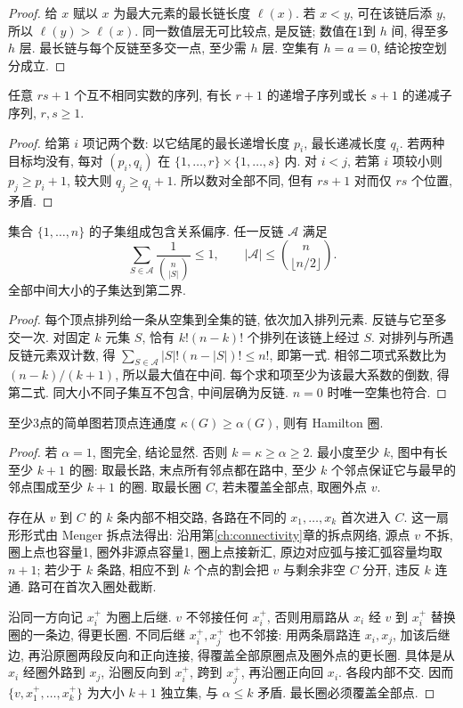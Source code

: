 \begin{proof}
给 $x$ 赋以 $x$ 为最大元素的最长链长度 $\ell(x)$. 若 $x<y$, 可在该链后添 $y$, 所以 $\ell(y)>\ell(x)$. 同一数值层无可比较点, 是反链; 数值在1到 $h$ 间, 得至多 $h$ 层. 最长链与每个反链至多交一点, 至少需 $h$ 层. 空集有 $h=a=0$, 结论按空划分成立.
\end{proof}
\begin{corollary}\label{cor:es}
任意 $rs+1$ 个互不相同实数的序列, 有长 $r+1$ 的递增子序列或长 $s+1$ 的递减子序列, $r,s\ge1$.
\end{corollary}
\begin{proof}
给第 $i$ 项记两个数: 以它结尾的最长递增长度 $p_i$, 最长递减长度 $q_i$. 若两种目标均没有, 每对 $(p_i,q_i)$ 在 $\{1,\ldots,r\}\times\{1,\ldots,s\}$ 内. 对 $i<j$, 若第 $i$ 项较小则 $p_j\ge p_i+1$, 较大则 $q_j\ge q_i+1$. 所以数对全部不同, 但有 $rs+1$ 对而仅 $rs$ 个位置, 矛盾.
\end{proof}
\begin{theorem}[Sperner]\label{thm:sperner}
集合 $\{1,\ldots,n\}$ 的子集组成包含关系偏序. 任一反链 $\mathcal A$ 满足
\[
\sum_{S\in\mathcal A}\frac1{\binom n{|S|}}\le1,\qquad
|\mathcal A|\le\binom n{\lfloor n/2\rfloor}.
\]
全部中间大小的子集达到第二界.
\end{theorem}
\begin{proof}
每个顶点排列给一条从空集到全集的链, 依次加入排列元素. 反链与它至多交一次. 对固定 $k$ 元集 $S$, 恰有 $k!(n-k)!$ 个排列在该链上经过 $S$. 对排列与所遇反链元素双计数, 得 $\sum_{S\in\mathcal A}|S|!(n-|S|)!\le n!$, 即第一式. 相邻二项式系数比为 $(n-k)/(k+1)$, 所以最大值在中间. 每个求和项至少为该最大系数的倒数, 得第二式. 同大小不同子集互不包含, 中间层确为反链. $n=0$ 时唯一空集也符合.
\end{proof}
\begin{theorem}\label{thm:chvatalerdos}
至少3点的简单图若顶点连通度 $\kappa(G)\ge\alpha(G)$, 则有 Hamilton 圈.
\end{theorem}
\begin{proof}
若 $\alpha=1$, 图完全, 结论显然. 否则 $k=\kappa\ge\alpha\ge2$. 最小度至少 $k$, 图中有长至少 $k+1$ 的圈: 取最长路, 末点所有邻点都在路中, 至少 $k$ 个邻点保证它与最早的邻点围成至少 $k+1$ 的圈. 取最长圈 $C$, 若未覆盖全部点, 取圈外点 $v$.

存在从 $v$ 到 $C$ 的 $k$ 条内部不相交路, 各路在不同的 $x_1,\ldots,x_k$ 首次进入 $C$. 这一扇形形式由 Menger 拆点法得出: 沿用第\ref{ch:connectivity}章的拆点网络, 源点 $v$ 不拆, 圈上点也容量1, 圈外非源点容量1, 圈上点接新汇, 原边对应弧与接汇弧容量均取 $n+1$; 若少于 $k$ 条路, 相应不到 $k$ 个点的割会把 $v$ 与剩余非空 $C$ 分开, 违反 $k$ 连通. 路可在首次入圈处截断.

沿同一方向记 $x_i^+$ 为圈上后继. $v$ 不邻接任何 $x_i^+$, 否则用扇路从 $x_i$ 经 $v$ 到 $x_i^+$ 替换圈的一条边, 得更长圈. 不同后继 $x_i^+,x_j^+$ 也不邻接: 用两条扇路连 $x_i,x_j$, 加该后继边, 再沿原圈两段反向和正向连接, 得覆盖全部原圈点及圈外点的更长圈. 具体是从 $x_i$ 经圈外路到 $x_j$, 沿圈反向到 $x_i^+$, 跨到 $x_j^+$, 再沿圈正向回 $x_i$. 各段内部不交. 因而 $\{v,x_1^+,\ldots,x_k^+\}$ 为大小 $k+1$ 独立集, 与 $\alpha\le k$ 矛盾. 最长圈必须覆盖全部点.
\end{proof}

